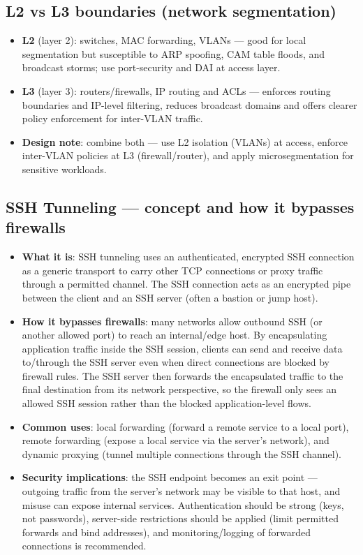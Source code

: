 \documentclass[11pt]{article}
\begin{document}
\subsection{L2 vs L3 boundaries (network segmentation)}
\begin{itemize}
  \item \textbf{L2} (layer 2): switches, MAC forwarding, VLANs --- good for local segmentation but susceptible to ARP spoofing, CAM table floods, and broadcast storms; use port-security and DAI at access layer.
  
  \item \textbf{L3} (layer 3): routers/firewalls, IP routing and ACLs --- enforces routing boundaries and IP-level filtering, reduces broadcast domains and offers clearer policy enforcement for inter-VLAN traffic.
  
  \item \textbf{Design note}: combine both --- use L2 isolation (VLANs) at access, enforce inter-VLAN policies at L3 (firewall/router), and apply microsegmentation for sensitive workloads.
\end{itemize}

\subsection{SSH Tunneling --- concept and how it bypasses firewalls}
\begin{itemize}
  \item \textbf{What it is}: SSH tunneling uses an authenticated, encrypted SSH connection as a generic transport to carry other TCP connections or proxy traffic through a permitted channel. The SSH connection acts as an encrypted pipe between the client and an SSH server (often a bastion or jump host).
  
  \item \textbf{How it bypasses firewalls}: many networks allow outbound SSH (or another allowed port) to reach an internal/edge host. By encapsulating application traffic inside the SSH session, clients can send and receive data to/through the SSH server even when direct connections are blocked by firewall rules. The SSH server then forwards the encapsulated traffic to the final destination from its network perspective, so the firewall only sees an allowed SSH session rather than the blocked application-level flows.
  
  \item \textbf{Common uses}: local forwarding (forward a remote service to a local port), remote forwarding (expose a local service via the server's network), and dynamic proxying (tunnel multiple connections through the SSH channel).
  
  \item \textbf{Security implications}: the SSH endpoint becomes an exit point --- outgoing traffic from the server's network may be visible to that host, and misuse can expose internal services. Authentication should be strong (keys, not passwords), server-side restrictions should be applied (limit permitted forwards and bind addresses), and monitoring/logging of forwarded connections is recommended.
\end{itemize}
\end{document}
